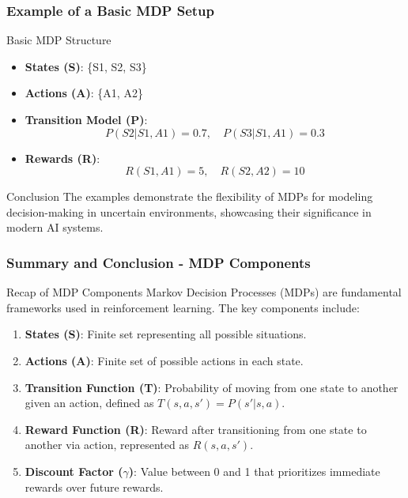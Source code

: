 \documentclass[aspectratio=169]{beamer}
\begin{document}
\begin{frame}[fragile]
    \frametitle{Example of a Basic MDP Setup}
    \begin{block}{Basic MDP Structure}
        \begin{itemize}
            \item \textbf{States (S)}: \{S1, S2, S3\}
            \item \textbf{Actions (A)}: \{A1, A2\}
            \item \textbf{Transition Model (P)}:
                \begin{equation}
                    P(S2|S1, A1) = 0.7, \quad P(S3|S1, A1) = 0.3
                \end{equation}
            \item \textbf{Rewards (R)}:
                \begin{equation}
                    R(S1, A1) = 5, \quad R(S2, A2) = 10
                \end{equation}
        \end{itemize}
    \end{block}
    
    \begin{block}{Conclusion}
        The examples demonstrate the flexibility of MDPs for modeling decision-making in uncertain environments, showcasing their significance in modern AI systems.
    \end{block}
\end{frame}

\begin{frame}[fragile]
    \frametitle{Summary and Conclusion - MDP Components}
    \begin{block}{Recap of MDP Components}
        Markov Decision Processes (MDPs) are fundamental frameworks used in reinforcement learning. The key components include:
    \end{block}
    \begin{enumerate}
        \item \textbf{States (S)}: Finite set representing all possible situations.
        \item \textbf{Actions (A)}: Finite set of possible actions in each state.
        \item \textbf{Transition Function (T)}: Probability of moving from one state to another given an action, defined as \(T(s, a, s') = P(s' | s, a)\).
        \item \textbf{Reward Function (R)}: Reward after transitioning from one state to another via action, represented as \(R(s, a, s')\).
        \item \textbf{Discount Factor ($\gamma$)}: Value between 0 and 1 that prioritizes immediate rewards over future rewards.
    \end{enumerate}
\end{frame}
\end{document}
